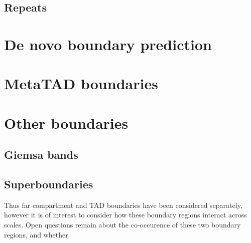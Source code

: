 \documentclass[a4paper,10pt,oneside]{book}
\begin{document}
\subsection{Repeats}


\section{De novo boundary prediction}

\section{MetaTAD boundaries}

\section{Other boundaries}

\subsection{Giemsa bands}

\subsection{Superboundaries}

Thus far compartment and TAD boundaries have been considered separately, however it is of interest to consider how these boundary regions interact across scales. Open questions remain about the co-occurence of these two boundary regions, and whether 


\ifstandalone
\begin{small}

\end{small}
\fi
\end{document}
